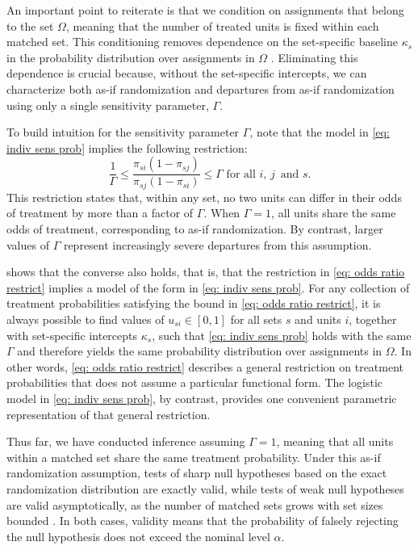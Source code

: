 \documentclass[twoside,11pt]{article}
\begin{document}
An important point to reiterate is that we condition on assignments that
belong to the set \(\Omega\), meaning that the number of treated units
is fixed within each matched set. This conditioning
removes dependence on the set-specific baseline \(\kappa_s\) in the
probability distribution over assignments in \(\Omega\)
\citep{rosenbaum1984, rosenbaumkrieger1990}. Eliminating this dependence is crucial because, without the set-specific intercepts, we can
characterize both as-if randomization and departures from as-if
randomization using only a single sensitivity parameter, \(\Gamma\).

To build intuition for the sensitivity parameter \(\Gamma\), note that
the model in \eqref{eq: indiv sens prob} implies the following
restriction: \begin{equation} \label{eq: odds ratio restrict}
\frac{1}{\Gamma} \leq \frac{\pi_{si}\left(1 - \pi_{sj}\right)}{\pi_{sj}\left(1 - \pi_{si}\right)} \leq \Gamma \text{ for all } i, \, j \, \text{ and } s.
\end{equation} This restriction states that, within any set, no two
units can differ in their odds of treatment by more than a factor of
\(\Gamma\). When \(\Gamma = 1\), all units share the same odds of
treatment, corresponding to as-if randomization. By contrast, larger
values of \(\Gamma\) represent increasingly severe departures from this
assumption.

\citet[pp.~1424--1425]{rosenbaum1995a} shows that the converse also
holds, that is, that the restriction in \eqref{eq: odds ratio restrict} implies a
model of the form in \eqref{eq: indiv sens prob}. For any collection of
treatment probabilities satisfying the bound in
\eqref{eq: odds ratio restrict}, it is always possible to find values of
\(u_{si} \in [0,1]\) for all sets \(s\) and units \(i\), together with
set-specific intercepts \(\kappa_s\), such that \eqref{eq: indiv sens prob} holds with the same \(\Gamma\) and therefore yields the same
probability distribution over assignments in \(\Omega\). In other words,
\eqref{eq: odds ratio restrict} describes a general restriction on
treatment probabilities that does not assume a particular functional
form. The logistic model in \eqref{eq: indiv sens prob}, by contrast,
provides one convenient parametric representation of that general
restriction.

Thus far, we have conducted inference assuming \(\Gamma = 1\), meaning
that all units within a matched set share the same treatment
probability. Under this as-if randomization assumption, tests of sharp
null hypotheses based on the exact randomization distribution are exactly valid, while tests of weak null hypotheses
are valid asymptotically, as the number of matched sets grows with set
sizes bounded \citep{fogarty2018, fogarty2023}. In both cases, validity means that the
probability of falsely rejecting the null hypothesis does not exceed the
nominal level \(\alpha\).
\end{document}

